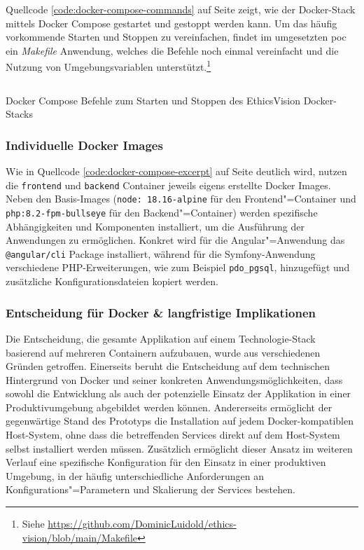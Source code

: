 \documentclass[a4paper,12pt,twoside]{scrreprt}
\begin{document}
\medskip

Quellcode \ref{code:docker-compose-commands} auf Seite \pageref{code:docker-compose-commands} zeigt, wie der Docker-Stack mittels Docker Compose gestartet und gestoppt werden kann. Um das häufig vorkommende Starten und Stoppen zu vereinfachen, findet im umgesetzten \ac{poc} ein \textit{Makefile} Anwendung, welches die Befehle noch einmal vereinfacht und die Nutzung von Umgebungsvariablen unterstützt.\footnote{Siehe \url{https://github.com/DominicLuidold/ethics-vision/blob/main/Makefile}}

\begin{listing}[ht]
    \inputminted[fontsize=\footnotesize,linenos,xleftmargin=8mm]{bash}{code/Luidold_Docker-Compose-Commands.sh}
    \caption{Docker Compose Befehle zum Starten und Stoppen des EthicsVision Docker-Stacks}
    \label{code:docker-compose-commands}
\end{listing}

\subsubsection*{Individuelle Docker Images}
\label{sub-sub-sec:individuelle-docker-images}

Wie in Quellcode \ref{code:docker-compose-excerpt} auf Seite \pageref{code:docker-compose-excerpt} deutlich wird, nutzen die \texttt{frontend} und \texttt{backend} Container jeweils eigens erstellte Docker Images. Neben den Basis-Images (\texttt{node: 18.16-alpine} für den Frontend"=Container und \texttt{php:8.2-fpm-bullseye} für den Backend"=Container) werden spezifische Abhängigkeiten und Komponenten installiert, um die Ausführung der Anwendungen zu ermöglichen. Konkret wird für die Angular"=Anwendung das \texttt{@angular/cli} Package installiert, während für die Symfony-Anwendung verschiedene PHP-Erweiterungen, wie zum Beispiel \texttt{pdo\_pgsql}, hinzugefügt und zusätzliche Konfigurationsdateien kopiert werden.

\subsubsection*{Entscheidung für Docker \& langfristige Implikationen}
\label{sub-sub-sec:entscheidung-docker}

Die Entscheidung, die gesamte Applikation auf einem Technologie-Stack basierend auf mehreren Containern aufzubauen, wurde aus verschiedenen Gründen getroffen. Einerseits beruht die Entscheidung auf dem technischen Hintergrund von Docker und seiner konkreten Anwendungsmöglichkeiten, dass sowohl die Entwicklung als auch der potenzielle Einsatz der Applikation in einer Produktivumgebung abgebildet werden können. Andererseits ermöglicht der gegenwärtige Stand des Prototyps die Installation auf jedem Docker-kompatiblen Host-System, ohne dass die betreffenden Services direkt auf dem Host-System selbst installiert werden müssen. Zusätzlich ermöglicht dieser Ansatz im weiteren Verlauf eine spezifische Konfiguration für den Einsatz in einer produktiven Umgebung, in der häufig unterschiedliche Anforderungen an Konfigurations"=Parametern und Skalierung der Services bestehen.
\end{document}
